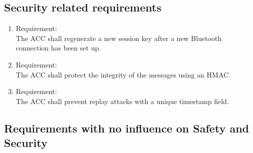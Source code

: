 




        
	 	

\subsection{Security related requirements}

\begin{enumerate}[label*=\arabic*.]
 	\item \label{req.sec.1}  Requirement: \\
	 	The ACC shall regenerate a new session key after a new Bluetooth connection has been set up.   \\

        \item \label{req.sec.2} Requirement: \\
        The ACC shall protect the integrity of the messages using an HMAC.  \\
	 	\item \label{req.sec.3} Requirement: \\
        The ACC shall prevent replay attacks with a unique timestamp field. \\

 \end{enumerate}

\subsection{Requirements with no influence on Safety and Security}

